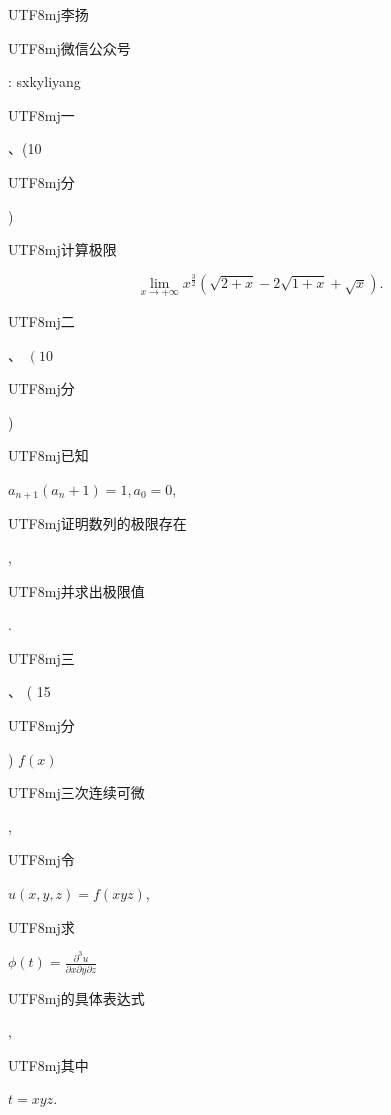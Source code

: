 \documentclass[10pt]{article}
\begin{document}
\begin{CJK}{UTF8}{mj}李扬\end{CJK}

\begin{CJK}{UTF8}{mj}微信公众号\end{CJK}: sxkyliyang

\begin{CJK}{UTF8}{mj}一\end{CJK}、(10 \begin{CJK}{UTF8}{mj}分\end{CJK}) \begin{CJK}{UTF8}{mj}计算极限\end{CJK}
$$
\lim _{x \rightarrow+\infty} x^{\frac{3}{2}}(\sqrt{2+x}-2 \sqrt{1+x}+\sqrt{x}) .
$$
\begin{CJK}{UTF8}{mj}二\end{CJK}、 $\left(10\right.$ \begin{CJK}{UTF8}{mj}分\end{CJK}) \begin{CJK}{UTF8}{mj}已知\end{CJK} $a_{n+1}\left(a_{n}+1\right)=1, a_{0}=0$, \begin{CJK}{UTF8}{mj}证明数列的极限存在\end{CJK}, \begin{CJK}{UTF8}{mj}并求出极限值\end{CJK}.

\begin{CJK}{UTF8}{mj}三\end{CJK}、 ( 15 \begin{CJK}{UTF8}{mj}分\end{CJK}) $f(x)$ \begin{CJK}{UTF8}{mj}三次连续可微\end{CJK}, \begin{CJK}{UTF8}{mj}令\end{CJK} $u(x, y, z)=f(x y z)$, \begin{CJK}{UTF8}{mj}求\end{CJK} $\phi(t)=\frac{\partial^{3} u}{\partial x \partial y \partial z}$ \begin{CJK}{UTF8}{mj}的具体表达式\end{CJK}, \begin{CJK}{UTF8}{mj}其中\end{CJK} $t=x y z$.
\end{document}
